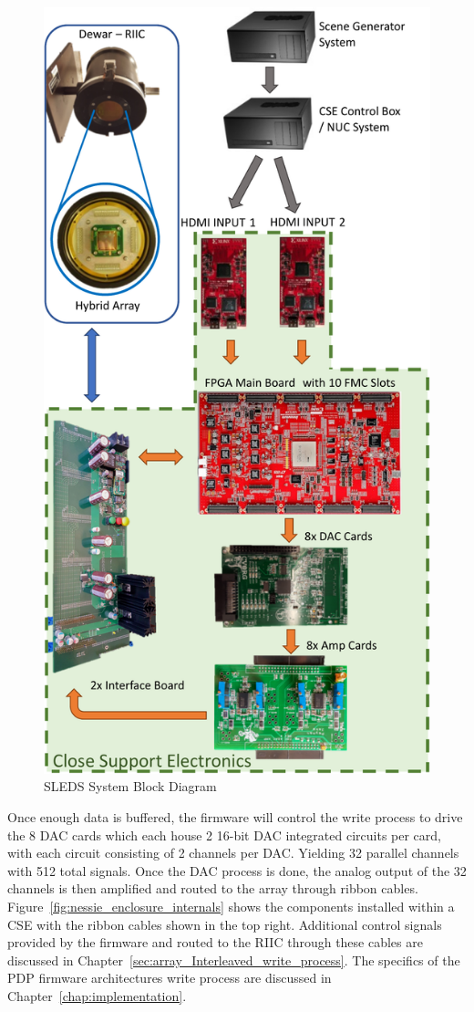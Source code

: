     \begin{figure}
        \centering
        \includegraphics[width=.65\textwidth]{fig/sleds_block.pdf}
        \caption{SLEDS System Block Diagram}
        \label{fig:sleds_block}
    \end{figure}

    Once enough data is buffered, the firmware will control the write process to drive the 8 DAC cards which each house 2 16-bit DAC integrated circuits per card, with each circuit consisting of 2 channels per DAC. Yielding 32 parallel channels with 512 total signals. Once the DAC process is done, the analog output of the 32 channels is then amplified and routed to the array through ribbon cables. Figure~\ref{fig:nessie_enclosure_internals} shows the components installed within a CSE with the ribbon cables shown in the top right. Additional control signals provided by the firmware and routed to the RIIC through these cables are discussed in Chapter~\ref{sec:array_Interleaved_write_process}. The specifics of the PDP firmware architectures write process are discussed in Chapter~\ref{chap:implementation}.

